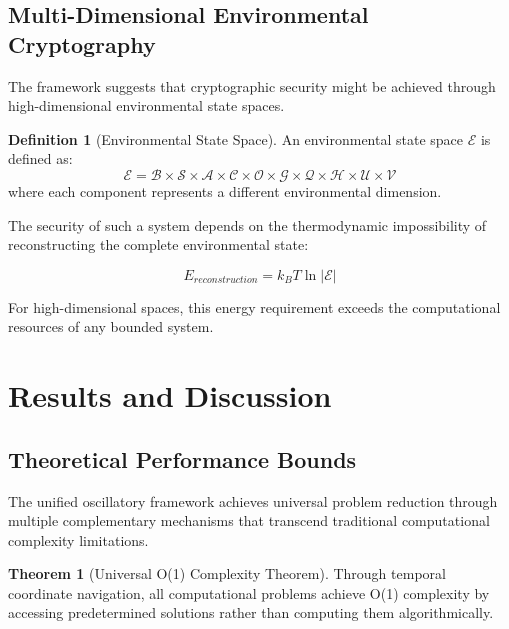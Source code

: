 \documentclass[12pt,a4paper]{article}
\theoremstyle{definition}
\newtheorem{definition}{Definition}[section]
\newtheorem{theorem}{Theorem}[section]
\begin{document}
{\subsection{Multi-Dimensional Environmental Cryptography}

The framework suggests that cryptographic security might be achieved through high-dimensional environmental state spaces.

\begin{definition}[Environmental State Space]
An environmental state space $\mathcal{E}$ is defined as:
\begin{equation}
\mathcal{E} = \mathcal{B} \times \mathcal{S} \times \mathcal{A} \times \mathcal{C} \times \mathcal{O} \times \mathcal{G} \times \mathcal{Q} \times \mathcal{H} \times \mathcal{U} \times \mathcal{V}
\end{equation}
where each component represents a different environmental dimension.
\end{definition}

The security of such a system depends on the thermodynamic impossibility of reconstructing the complete environmental state:

\begin{equation}
E_{reconstruction} = k_B T \ln|\mathcal{E}|
\end{equation}

For high-dimensional spaces, this energy requirement exceeds the computational resources of any bounded system.

\section{Results and Discussion}

\subsection{Theoretical Performance Bounds}

The unified oscillatory framework achieves universal problem reduction through multiple complementary mechanisms that transcend traditional computational complexity limitations.

\begin{theorem}[Universal O(1) Complexity Theorem]
Through temporal coordinate navigation, all computational problems achieve O(1) complexity by accessing predetermined solutions rather than computing them algorithmically.
\end{theorem}

}
\end{document}
